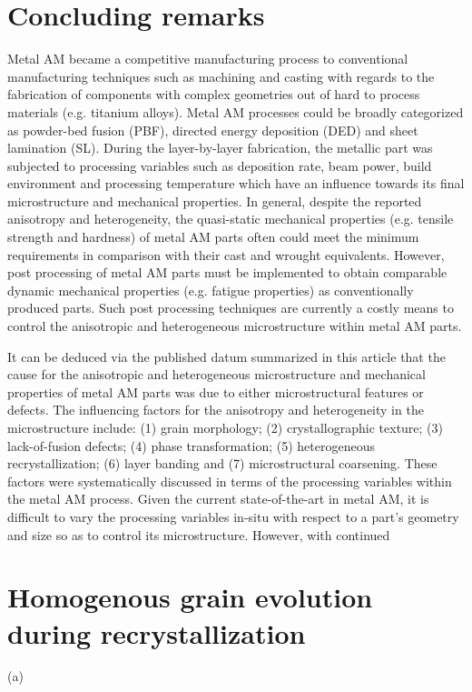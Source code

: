\documentclass[10pt]{article}
\begin{document}
\section*{Concluding remarks}
Metal AM became a competitive manufacturing process to conventional manufacturing techniques such as machining and casting with regards to the fabrication of components with complex geometries out of hard to process materials (e.g. titanium alloys). Metal AM processes could be broadly categorized as powder-bed fusion (PBF), directed energy deposition (DED) and sheet lamination (SL). During the layer-by-layer fabrication, the metallic part was subjected to processing variables such as deposition rate, beam power, build environment and processing temperature which have an influence towards its final microstructure and mechanical properties. In general, despite the reported anisotropy and heterogeneity, the quasi-static mechanical properties (e.g. tensile strength and hardness) of metal AM parts often could meet the minimum requirements in comparison with their cast and wrought equivalents. However, post processing of metal AM parts must be implemented to obtain comparable dynamic mechanical properties (e.g. fatigue properties) as conventionally produced parts. Such post processing techniques are currently a costly means to control the anisotropic and heterogeneous microstructure within metal AM parts.

It can be deduced via the published datum summarized in this article that the cause for the anisotropic and heterogeneous microstructure and mechanical properties of metal AM parts was due to either microstructural features or defects. The influencing factors for the anisotropy and heterogeneity in the microstructure include: (1) grain morphology; (2) crystallographic texture; (3) lack-of-fusion defects; (4) phase transformation; (5) heterogeneous recrystallization; (6) layer banding and (7) microstructural coarsening. These factors were systematically discussed in terms of the processing variables within the metal AM process. Given the current state-of-the-art in metal AM, it is difficult to vary the processing variables in-situ with respect to a part's geometry and size so as to control its microstructure. However, with continued

\section*{Homogenous grain evolution during recrystallization}
(a)
\end{document}
